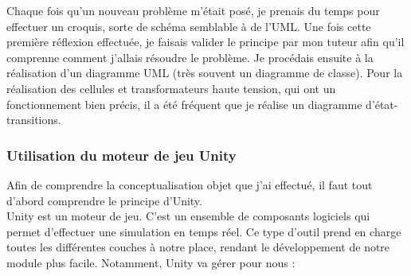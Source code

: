 \documentclass[a4paper]{article}
\begin{document}
    Chaque fois qu'un nouveau problème m'était posé, je prenais du temps pour effectuer un croquis, sorte de schéma semblable à de l'UML. Une fois cette première réflexion effectuée, je faisais valider le principe par mon tuteur afin qu'il comprenne comment j'allais résoudre le problème. Je procédais ensuite à la réalisation d'un diagramme UML (très souvent un diagramme de classe). Pour la réalisation des cellules et transformateurs haute tension, qui ont un fonctionnement bien précis, il a été fréquent que je réalise un diagramme d'état-transitions. \\ 

    \subsubsection{Utilisation du moteur de jeu Unity}

    Afin de comprendre la conceptualisation objet que j'ai effectué, il faut tout d'abord comprendre le principe d'Unity. \\

    Unity est un moteur de jeu. C'est un ensemble de composants logiciels qui permet d'effectuer une simulation en temps réel. Ce type d'outil prend en charge toutes les différentes couches à notre place, rendant le développement de notre module plus facile. Notamment, Unity va gérer pour nous : \\
    
\end{document}
